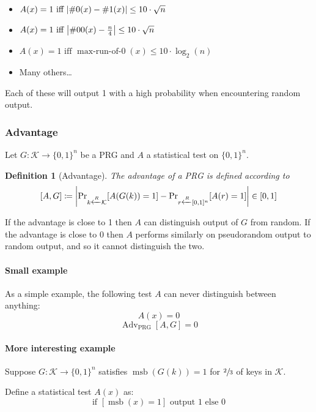\documentclass[10pt,a4paper]{report}
\newtheorem{definition}{Definition}[section]
\begin{document}
\begin{itemize}
    \item $A(x) = 1 \text{ iff } \abs{\#0(x) - \#1(x)} \leq 10 \cdot \sqrt{n}$
    \item $A(x) = 1 \text{ iff } \abs{\#00(x) - \tfrac{n}{4}} \leq 10 \cdot \sqrt{n}$
    \item $A(x) = 1 \text{ iff } \operatorname{max-run-of-0}(x) \leq 10 \cdot \log_2(n)$
    \item Many others\ldots
\end{itemize}

Each of these will output 1 with a high probability when encountering random output.

\subsubsection*{Advantage}

Let $G \colon \mathcal{K} \to \{0, 1\}^n$ be a PRG and $A$ a statistical test on $\{0, 1\}^n$.

\begin{definition}[Advantage]
    The advantage of a PRG is defined according to
    $$ [A, G] \coloneqq \abs{\operatorname{Pr}_{k \xleftarrow{R} \mathcal{K}} [A(G(k)) = 1]
       - \operatorname{Pr}_{r \xleftarrow{R} [0, 1]^n}[A(r) = 1]} \in [0, 1] $$
\end{definition}

If the advantage is close to 1 then $A$ can distinguish output of $G$ from random. If the advantage
is close to 0 then $A$ performs similarly on pseudorandom output to random output, and so it cannot
distinguish the two.

\paragraph{Small example} As a simple example, the following test $A$ can never distinguish between
anything:
    $$ A(x) = 0 $$
    $$ \operatorname{Adv}_\text{PRG}[A, G] = 0 $$

\paragraph{More interesting example} Suppose $G \colon \mathcal{K} \to \{0, 1\}^n$ satisfies
$\operatorname{msb}(G(k)) = 1$ for $\sfrac{2}{3}$ of keys in $\mathcal{K}$.

Define a statistical test $A(x)$ as:
    $$ \text{if } [\operatorname{msb}(x) = 1] \text{ output } 1 \text{ else } 0 $$
\end{document}
